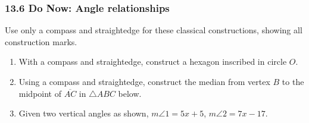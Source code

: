 \documentclass[12pt, twoside]{article}
\begin{document}
\subsubsection*{13.6 Do Now: Angle relationships}
Use only a compass and straightedge for these classical constructions, showing all construction marks.
 \begin{enumerate}

 \item With a compass and straightedge, construct a hexagon inscribed in circle $O$.
   \vspace{0.5cm}
   \begin{center}
   \end{center}
      \vspace{1cm}

   \item Using  a  compass  and  straightedge,  construct the median from vertex $B$ to the midpoint of $\overline{AC}$ in $\triangle ABC$ below.
     \vspace{0.5cm}
   \begin{center}
   \end{center}

 \newpage

 \item Given two vertical angles as shown, $m \angle 1 = 5x+5$, $m \angle 2 = 7x-17$. \vspace{1cm}
   \begin{flushright}
   \end{flushright}
 \vspace{3cm}



\end{enumerate}
\end{document}

